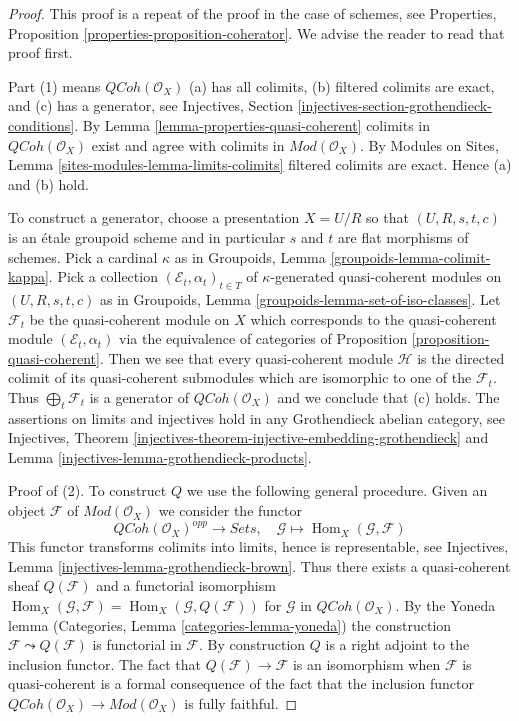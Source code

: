 \documentclass[10pt,a4paper]{amsart}
\theoremstyle{plain}
\theoremstyle{definition}
\theoremstyle{remark}
\numberwithin{equation}{subsection}
\def\Hom{\mathop{\mathrm{Hom}}\nolimits}
\def\QCoh{\mathit{QCoh}}
\begin{document}
\begin{proof}
This proof is a repeat of the proof in the case of schemes, see
Properties, Proposition \ref{properties-proposition-coherator}.
We advise the reader to read that proof first.

\medskip\noindent
Part (1) means $\QCoh(\mathcal{O}_X)$ (a) has all colimits,
(b) filtered colimits are exact, and (c) has a generator, see
Injectives, Section \ref{injectives-section-grothendieck-conditions}.
By Lemma \ref{lemma-properties-quasi-coherent}
colimits in $\QCoh(\mathcal{O}_X)$ exist and agree
with colimits in $\textit{Mod}(\mathcal{O}_X)$. By
Modules on Sites, Lemma \ref{sites-modules-lemma-limits-colimits}
filtered colimits are exact. Hence (a) and (b) hold.

\medskip\noindent
To construct a generator, choose a presentation $X = U/R$ so that
$(U, R, s, t, c)$ is an
\'etale groupoid scheme and in particular $s$ and $t$ are flat morphisms
of schemes. Pick a cardinal $\kappa$ as in
Groupoids, Lemma \ref{groupoids-lemma-colimit-kappa}.
Pick a collection $(\mathcal{E}_t, \alpha_t)_{t \in T}$ of
$\kappa$-generated quasi-coherent modules on
$(U, R, s, t, c)$ as in
Groupoids, Lemma \ref{groupoids-lemma-set-of-iso-classes}.
Let $\mathcal{F}_t$ be the quasi-coherent module on $X$ which
corresponds to the quasi-coherent module $(\mathcal{E}_t, \alpha_t)$ via
the equivalence of categories of
Proposition \ref{proposition-quasi-coherent}.
Then we see that every quasi-coherent module $\mathcal{H}$ is the
directed colimit of its quasi-coherent submodules which are isomorphic
to one of the $\mathcal{F}_t$. Thus $\bigoplus_t \mathcal{F}_t$ is
a generator of $\QCoh(\mathcal{O}_X)$ and we conclude that (c) holds.
The assertions on limits and injectives hold in any
Grothendieck abelian category, see
Injectives, Theorem
\ref{injectives-theorem-injective-embedding-grothendieck} and
Lemma \ref{injectives-lemma-grothendieck-products}.

\medskip\noindent
Proof of (2). To construct $Q$ we use the following general procedure.
Given an object $\mathcal{F}$ of $\textit{Mod}(\mathcal{O}_X)$
we consider the functor
$$
\QCoh(\mathcal{O}_X)^{opp} \longrightarrow \textit{Sets},\quad
\mathcal{G} \longmapsto \Hom_X(\mathcal{G}, \mathcal{F})
$$
This functor transforms colimits into limits,
hence is representable, see
Injectives, Lemma \ref{injectives-lemma-grothendieck-brown}.
Thus there exists a quasi-coherent sheaf $Q(\mathcal{F})$
and a functorial isomorphism
$\Hom_X(\mathcal{G}, \mathcal{F}) = \Hom_X(\mathcal{G}, Q(\mathcal{F}))$
for $\mathcal{G}$ in $\QCoh(\mathcal{O}_X)$. By the Yoneda lemma
(Categories, Lemma \ref{categories-lemma-yoneda})
the construction $\mathcal{F} \leadsto Q(\mathcal{F})$ is
functorial in $\mathcal{F}$. By construction $Q$ is a right
adjoint to the inclusion functor.
The fact that $Q(\mathcal{F}) \to \mathcal{F}$ is an isomorphism
when $\mathcal{F}$ is quasi-coherent is a formal consequence of the fact
that the inclusion functor
$\QCoh(\mathcal{O}_X) \to \textit{Mod}(\mathcal{O}_X)$
is fully faithful.
\end{proof}
\end{document}
